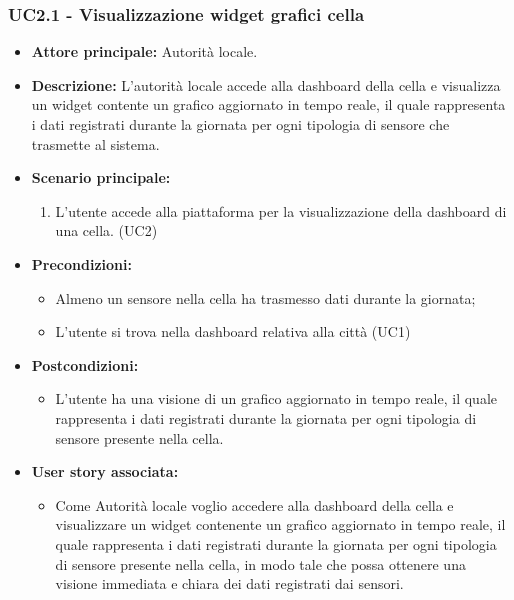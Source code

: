 \subsubsection{UC2.1 - Visualizzazione widget grafici cella}
\begin{itemize}
    \item \textbf{Attore principale:} Autorità locale.
    \item \textbf{Descrizione:} L'autorità locale accede alla dashboard della cella e visualizza un widget contente un grafico aggiornato in tempo reale, il quale rappresenta i dati registrati durante la giornata per ogni tipologia di sensore che trasmette al sistema.
    \item \textbf{Scenario principale:}
          \begin{enumerate}
            \item L'utente accede alla piattaforma per la visualizzazione della dashboard di una cella. (UC2)
          \end{enumerate}
    \item \textbf{Precondizioni:}
          \begin{itemize}
              \item  Almeno un sensore nella cella ha trasmesso dati durante la giornata;
              \item L'utente si trova nella dashboard relativa alla città (UC1)
          \end{itemize}
    \item \textbf{Postcondizioni:}
          \begin{itemize}
              \item L'utente ha una visione di un grafico aggiornato in tempo reale, il quale rappresenta i dati registrati durante la giornata per ogni tipologia di sensore presente nella cella.
          \end{itemize}
    \item \textbf{User story associata:}
          \begin{itemize}
              \item Come Autorità locale voglio accedere alla dashboard della cella e visualizzare un widget contenente un grafico aggiornato in tempo reale, il quale rappresenta i dati registrati durante la giornata per ogni tipologia di sensore presente nella cella,
                    in modo tale che possa ottenere una visione immediata e chiara dei dati registrati dai sensori.
          \end{itemize}
\end{itemize}
